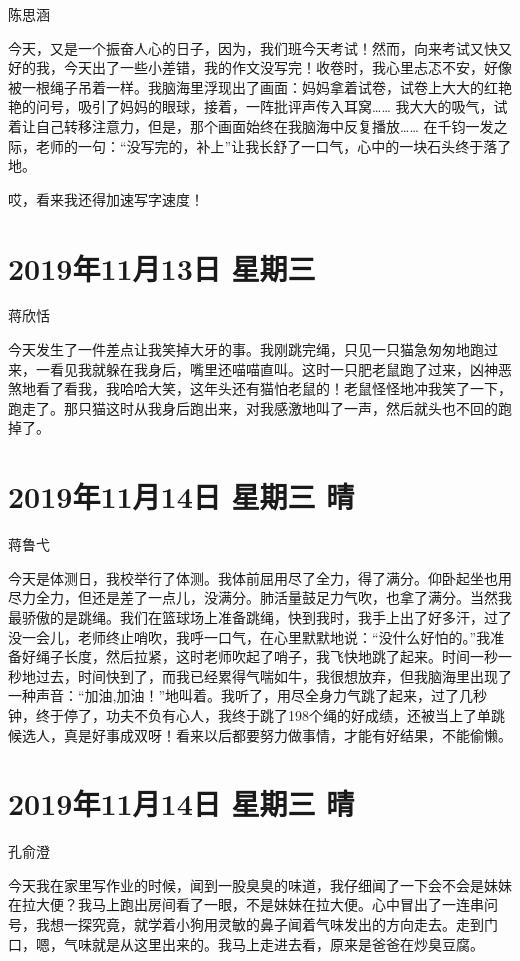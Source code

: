 陈思涵

今天，又是一个振奋人心的日子，因为，我们班今天考试！然而，向来考试又快又好的我，今天出了一些小差错，我的作文没写完！收卷时，我心里忐忑不安，好像被一根绳子吊着一样。我脑海里浮现出了画面：妈妈拿着试卷，试卷上大大的红艳艳的问号，吸引了妈妈的眼球，接着，一阵批评声传入耳窝…… 我大大的吸气，试着让自己转移注意力，但是，那个画面始终在我脑海中反复播放…… 在千钧一发之际，老师的一句：“没写完的，补上”让我长舒了一口气，心中的一块石头终于落了地。

哎，看来我还得加速写字速度！

\section{2019年11月13日 星期三}

蒋欣恬

今天发生了一件差点让我笑掉大牙的事。我刚跳完绳，只见一只猫急匆匆地跑过来，一看见我就躲在我身后，嘴里还喵喵直叫。这时一只肥老鼠跑了过来，凶神恶煞地看了看我，我哈哈大笑，这年头还有猫怕老鼠的！老鼠怪怪地冲我笑了一下，跑走了。那只猫这时从我身后跑出来，对我感激地叫了一声，然后就头也不回的跑掉了。

\section{2019年11月14日 星期三 晴}

蒋鲁弋

今天是体测日，我校举行了体测。我体前屈用尽了全力，得了满分。仰卧起坐也用尽力全力，但还是差了一点儿，没满分。肺活量鼓足力气吹，也拿了满分。当然我最骄傲的是跳绳。我们在篮球场上准备跳绳，快到我时，我手上出了好多汗，过了没一会儿，老师终止哨吹，我呼一口气，在心里默默地说：“没什么好怕的。”我准备好绳子长度，然后拉紧，这时老师吹起了哨子，我飞快地跳了起来。时间一秒一秒地过去，时间快到了，而我已经累得气喘如牛，我很想放弃，但我脑海里出现了一种声音：“加油,加油！”地叫着。我听了，用尽全身力气跳了起来，过了几秒钟，终于停了，功夫不负有心人，我终于跳了198个绳的好成绩，还被当上了单跳候选人，真是好事成双呀！看来以后都要努力做事情，才能有好结果，不能偷懒。

\section{2019年11月14日 星期三 晴}

孔俞澄

今天我在家里写作业的时候，闻到一股臭臭的味道，我仔细闻了一下会不会是妹妹在拉大便？我马上跑出房间看了一眼，不是妹妹在拉大便。心中冒出了一连串问号，我想一探究竟，就学着小狗用灵敏的鼻子闻着气味发出的方向走去。走到门口，嗯，气味就是从这里出来的。我马上走进去看，原来是爸爸在炒臭豆腐。

